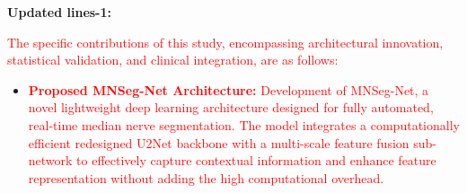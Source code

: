 \documentclass[12pt,letterpaper]{article}
\begin{document}
\begin{enumerate}











\textbf{Updated lines-1:}

\textcolor{red}{The specific contributions of this study, encompassing architectural innovation, statistical validation, and clinical integration, are as follows:}

\begin{itemize}

\item \textcolor{red}{\textbf{Proposed MNSeg-Net Architecture:} Development of MNSeg-Net, a novel lightweight deep learning architecture designed for fully automated, real-time median nerve segmentation. The model integrates a computationally efficient redesigned U2Net backbone with a multi-scale feature fusion sub-network to effectively capture contextual information and enhance feature representation without adding the high computational overhead.}



\end{itemize}
\end{enumerate}
\end{document}
